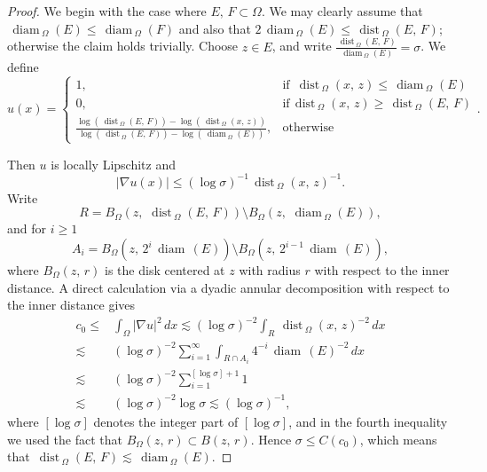 \documentclass[10pt,a4paper]{amsart}
\def\diam{{\mathop\mathrm{\,diam\,}}}
\def\dist{{\mathop\mathrm{\,dist\,}}}
\def\ls{\lesssim}
\begin{document}
\begin{proof}
We begin with the case where $E,\,F\subset \Omega$. 
We may clearly assume that $\diam_{\Omega}(E)\le \diam_{\Omega}(F)$ and also that
$2\diam_{\Omega}(E) \le \dist_{\Omega}(E,\,F)$; otherwise the claim holds trivially. 
Choose $z\in E$, and write $\frac{\dist_{\Omega}(E,\,F)}{\diam_{\Omega}(E)}=\sigma$. 
We define
$$ u(x)=
 \begin{cases}
   1, & \text{if } \dist_{\Omega}(x,\,z)\le \diam_{\Omega}(E) \\
  0, & \text{if}  \dist_{\Omega}(x,\,z)\ge \dist_{\Omega}(E,\,F)\\
      \frac {\log (\dist_{\Omega}(E,\,F))-\log (\dist_{\Omega}(x,\,z))}{\log (\dist_{\Omega}(E,\,F))-\log (\diam_{\Omega}(E))}, &\text{otherwise }
 \end{cases}.$$

Then $u$ is locally Lipschitz and 
$$|\nabla u(x)|\le (\log \sigma)^{-1} \dist_{\Omega}(x,\,z)^{-1}.$$
Write
$$R=B_{\Omega}(z,\,\dist_{\Omega}(E,\,F))\setminus B_{\Omega}(z,\,\diam_{\Omega}(E)),$$
and for $i\ge 1$
$$A_i=B_{\Omega}(z,\,2^{i}\diam(E))\setminus B_{\Omega}(z,\,2^{i-1}\diam(E)),$$
where $B_{\Omega}(z,\,r)$ is the disk centered at $z$ with radius $r$ with respect to the inner distance. 
A direct calculation via a dyadic annular decomposition with respect
to the inner distance gives
\begin{align*}
c_0\le & \int_{\Omega} |\nabla u|^2\, dx  
\ls   (\log \sigma)^{-2}\int_{R} \dist_{\Omega}(x,\,z)^{-2} \, dx\\ 
\ls &   (\log \sigma)^{-2} \sum_{i=1}^{\infty}\int_{R\cap A_i } 4^{-i}\diam(E)^{-2} \, dx\\
\ls &   (\log \sigma)^{-2} \sum_{i=1}^{[\log \sigma]+1} 1\\
\ls &  (\log \sigma)^{-2} \log \sigma \lesssim  {(\log \sigma)}^{-1}, 
\end{align*}
where  $[\log \sigma]$ denotes the integer part of $[\log \sigma]$, and in the fourth inequality we used the fact that $B_{\Omega}(z,\,r)\subset B(z,\,r)$. 
Hence $\sigma\le C(c_0)$, which means that $\dist_{\Omega}(E,\,F) \lesssim \diam_{\Omega}(E)$. 



\end{proof}
\end{document}

